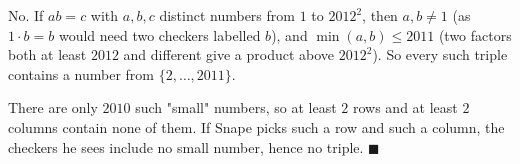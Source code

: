 $\boxed{\text{No}}$. If $ab=c$ with $a,b,c$ distinct numbers from $1$ to $2012^2$, then $a,b\ne1$ (as $1\cdot b=b$ would need two checkers labelled $b$), and $\min(a,b)\le2011$ (two factors both at least $2012$ and different give a product above $2012^2$). So every such triple contains a number from $\{2,\dots,2011\}$.

There are only $2010$ such "small" numbers, so at least $2$ rows and at least $2$ columns contain none of them. If Snape picks such a row and such a column, the checkers he sees include no small number, hence no triple. $\blacksquare$
